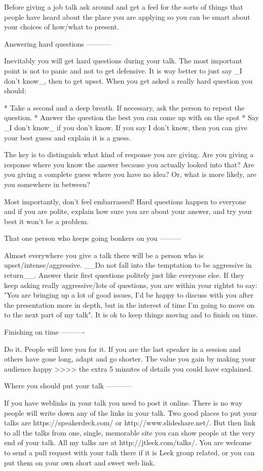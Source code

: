 \documentclass[12pt]{article}
\begin{document}
Before giving a job talk ask around and get a feel for the sorts of things that people have heard about the place you are applying so you can be smart about your choices of how/what to present. 


Answering hard questions
-----------

Inevitably you will get hard questions during your talk. The most important point is not to panic and not to get defensive. It is way better to just say _I don't know_, then to get upset. When you get asked a really hard question you should:

* Take a second and a deep breath. If necessary, ask the person to repeat the question. 
* Answer the question the best you can come up with on the spot
* Say _I don't know_ if you don't know. If you say I don't know, then you can give your best guess and explain it is a guess. 

The key is to distinguish what kind of response you are giving. Are you giving a response where you know the answer because you actually looked into that? Are you giving a complete guess where you have no idea? Or, what is more likely, are you somewhere in between? 

Most importantly, don't feel embarrassed! Hard questions happen to everyone and if you are polite, explain how sure you are about your answer, and try your best it won't be a problem. 


That one person who keeps going bonkers on you
---------

Almost everywhere you give a talk there will be a person who is upset/intense/aggressive. __Do not fall into the temptation to be aggressive in return__. Answer their first questions politely just like everyone else. If they keep asking really aggressive/lots of questions, you are within your rightst to say: "You are bringing up a lot of good issues, I'd be happy to discuss with you after the presentation more in depth, but in the interest of time I'm going to move on to the next part of my talk". It is ok to keep things moving and to finish on time. 

Finishing on time
----------

Do it. People will love you for it. If you are the last speaker in a session and others have gone long, adapt and go shorter. The value you gain by making your audience happy >>>> the extra 5 minutes of details you could have explained. 


Where you should put your talk
-----------

If you have weblinks in your talk you need to post it online. There is no way people will write down any of the links in your talk. Two good places to put your talks are https://speakerdeck.com/ or http://www.slideshare.net/. But then link to all the talks from one, single, memorable site you can show people at the very end of your talk. All my talks are at http://jtleek.com/talks/. You are welcome to send a pull request with your talk there if it is Leek group related, or you can put them on your own short and sweet web link. 
\end{document}
